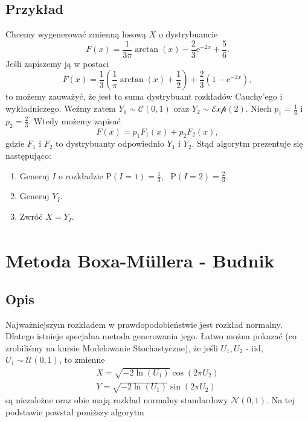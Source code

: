 \documentclass[12pt]{mwrep}
\begin{document}
	\subsection{Przykład}
	\noindent Chcemy wygenerować zmienną losową $X$ o dystrybuancie
	$$ F(x) = \frac{1}{3\pi}\arctan(x) - \frac{2}{3}\mathrm{e}^{-2x} + \frac{5}{6}. $$
	Jeśli zapiszemy ją w postaci
	$$ F(x) = \frac{1}{3}\left(\frac{1}{\pi}\arctan(x) + \frac{1}{2}\right) + \frac{2}{3}\left(1 - \mathrm{e}^{-2x}\right), $$
	to możemy zauważyć, że jest to suma dystrybuant rozkładów Cauchy'ego i wykładniczego. Weźmy zatem $Y_1 \sim \mathcal{C}(0, 1)$ oraz $Y_2 \sim \mathcal{Exp}(2)$. Niech $p_1 = \frac{1}{3}$ i $p_2 = \frac{2}{3}$. Wtedy możemy zapisać
	$$ F(x) = p_1 F_1(x) + p_2 F_2(x), $$
	gdzie $F_1$ i $F_2$ to dystrybuanty odpowiednio $Y_1$ i $Y_2$. Stąd algorytm prezentuje się następująco:
	\begin{enumerate}[leftmargin=10mm]
		\item Generuj $I$ o rozkładzie $\mathrm{P}(I = 1) = \frac{1}{3}$, \ $\mathrm{P}(I = 2) = \frac{2}{3}$.
		\item Generuj $Y_I$.
		\item Zwróć $X = Y_I$.
	\end{enumerate}



	
	\section{Metoda Boxa-M{\"u}llera\textsuperscript{\cite{box-kox}} - Budnik}
	\subsection{Opis}
	\noindent Najważniejszym rozkładem w prawdopodobieństwie jest rozkład normalny. Dlatego istnieje specjalna metoda generowania jego. Łatwo można pokazać (co zrobiliśmy na kursie Modelowanie Stochastyczne), że jeśli $U_1,U_2$ - iid, $U_1\sim\mathcal{U}(0,1)$, to zmienne
	\begin{equation}\label{eq:B-M}
		\begin{split}
			X=\sqrt{-2\ln(U_1)}\cos(2\pi U_2)\\
			Y=\sqrt{-2\ln(U_1)}\sin(2\pi U_2)
		\end{split}
	\end{equation}
	są niezależne oraz obie mają rozkład normalny standardowy $\mathcal{N}(0,1)$. Na tej podstawie powstał poniższy algorytm
\end{document}
